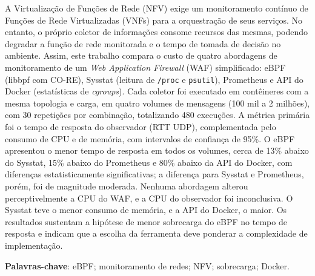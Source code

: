 \documentclass{ifpr-pinhais}
\begin{document}
\begin{resumo}
  A Virtualização de Funções de Rede (NFV) exige um monitoramento contínuo de Funções de Rede Virtualizadas (VNFs) para a orquestração de seus serviços. No entanto, o próprio coletor de informações consome recursos das mesmas, podendo degradar a função de rede monitorada e o tempo de tomada de decisão no ambiente. Assim, este trabalho compara o custo de quatro abordagens de monitoramento de um \textit{Web Application Firewall} (WAF) simplificado: eBPF (libbpf com CO-RE), Sysstat (leitura de \texttt{/proc} e \texttt{psutil}), Prometheus e API do Docker (estatísticas de \textit{cgroups}). Cada coletor foi executado em contêineres com a mesma topologia e carga, em quatro volumes de mensagens (100 mil a 2 milhões), com 30 repetições por combinação, totalizando 480 execuções. A métrica primária foi o tempo de resposta do observador (RTT UDP), complementada pelo consumo de CPU e de memória, com intervalos de confiança de 95\%. O eBPF apresentou o menor tempo de resposta em todos os volumes, cerca de 13\% abaixo do Sysstat, 15\% abaixo do Prometheus e 80\% abaixo da API do Docker, com diferenças estatisticamente significativas; a diferença para Sysstat e Prometheus, porém, foi de magnitude moderada. Nenhuma abordagem alterou perceptivelmente a CPU do WAF, e a CPU do observador foi inconclusiva. O Sysstat teve o menor consumo de memória, e a API do Docker, o maior. Os resultados sustentam a hipótese de menor sobrecarga do eBPF no tempo de resposta e indicam que a escolha da ferramenta deve ponderar a complexidade de implementação.

  \vspace{\onelineskip}
  \noindent
  \textbf{Palavras-chave}: eBPF; monitoramento de redes; NFV; sobrecarga; Docker.
\end{resumo}
\end{document}
